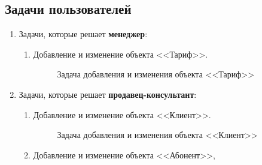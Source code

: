 \subsection{Задачи пользователей}\label{user-problems}


\begin{enumerate}
    \item Задачи, которые решает \textbf{менеджер}:
    \begin{enumerate}
        \item Добавление и изменение объекта <<Тариф>>.
        \begin{figure}[H]
            \label{fig:tariff-problem}
            \caption{Задача добавления и изменения объекта <<Тариф>>}
        \end{figure}
    \end{enumerate}

    \item Задачи, которые решает \textbf{продавец-консультант}:
    \begin{enumerate}
        \item Добавление и изменение объекта <<Клиент>>.
        \begin{figure}[H]
            \label{fig:client-problem}
            \caption{Задача добавления и изменения объекта <<Клиент>>}
        \end{figure}

        \item Добавление и изменение объекта <<Абонент>>,
    \end{enumerate}
\end{enumerate}